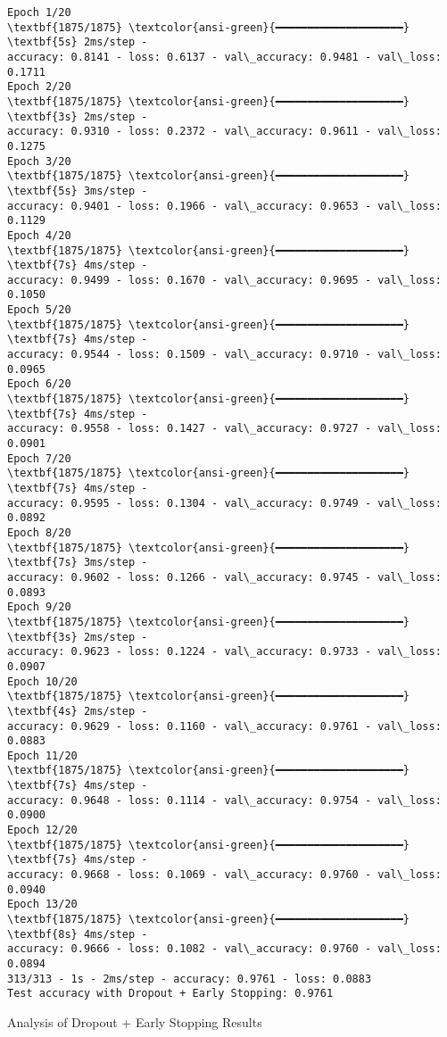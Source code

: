 \documentclass[11pt]{article}
\begin{document}
    \begin{Verbatim}[commandchars=\\\{\}]
Epoch 1/20
\textbf{1875/1875} \textcolor{ansi-green}{━━━━━━━━━━━━━━━━━━━━} \textbf{5s} 2ms/step -
accuracy: 0.8141 - loss: 0.6137 - val\_accuracy: 0.9481 - val\_loss: 0.1711
Epoch 2/20
\textbf{1875/1875} \textcolor{ansi-green}{━━━━━━━━━━━━━━━━━━━━} \textbf{3s} 2ms/step -
accuracy: 0.9310 - loss: 0.2372 - val\_accuracy: 0.9611 - val\_loss: 0.1275
Epoch 3/20
\textbf{1875/1875} \textcolor{ansi-green}{━━━━━━━━━━━━━━━━━━━━} \textbf{5s} 3ms/step -
accuracy: 0.9401 - loss: 0.1966 - val\_accuracy: 0.9653 - val\_loss: 0.1129
Epoch 4/20
\textbf{1875/1875} \textcolor{ansi-green}{━━━━━━━━━━━━━━━━━━━━} \textbf{7s} 4ms/step -
accuracy: 0.9499 - loss: 0.1670 - val\_accuracy: 0.9695 - val\_loss: 0.1050
Epoch 5/20
\textbf{1875/1875} \textcolor{ansi-green}{━━━━━━━━━━━━━━━━━━━━} \textbf{7s} 4ms/step -
accuracy: 0.9544 - loss: 0.1509 - val\_accuracy: 0.9710 - val\_loss: 0.0965
Epoch 6/20
\textbf{1875/1875} \textcolor{ansi-green}{━━━━━━━━━━━━━━━━━━━━} \textbf{7s} 4ms/step -
accuracy: 0.9558 - loss: 0.1427 - val\_accuracy: 0.9727 - val\_loss: 0.0901
Epoch 7/20
\textbf{1875/1875} \textcolor{ansi-green}{━━━━━━━━━━━━━━━━━━━━} \textbf{7s} 4ms/step -
accuracy: 0.9595 - loss: 0.1304 - val\_accuracy: 0.9749 - val\_loss: 0.0892
Epoch 8/20
\textbf{1875/1875} \textcolor{ansi-green}{━━━━━━━━━━━━━━━━━━━━} \textbf{7s} 3ms/step -
accuracy: 0.9602 - loss: 0.1266 - val\_accuracy: 0.9745 - val\_loss: 0.0893
Epoch 9/20
\textbf{1875/1875} \textcolor{ansi-green}{━━━━━━━━━━━━━━━━━━━━} \textbf{3s} 2ms/step -
accuracy: 0.9623 - loss: 0.1224 - val\_accuracy: 0.9733 - val\_loss: 0.0907
Epoch 10/20
\textbf{1875/1875} \textcolor{ansi-green}{━━━━━━━━━━━━━━━━━━━━} \textbf{4s} 2ms/step -
accuracy: 0.9629 - loss: 0.1160 - val\_accuracy: 0.9761 - val\_loss: 0.0883
Epoch 11/20
\textbf{1875/1875} \textcolor{ansi-green}{━━━━━━━━━━━━━━━━━━━━} \textbf{7s} 4ms/step -
accuracy: 0.9648 - loss: 0.1114 - val\_accuracy: 0.9754 - val\_loss: 0.0900
Epoch 12/20
\textbf{1875/1875} \textcolor{ansi-green}{━━━━━━━━━━━━━━━━━━━━} \textbf{7s} 4ms/step -
accuracy: 0.9668 - loss: 0.1069 - val\_accuracy: 0.9760 - val\_loss: 0.0940
Epoch 13/20
\textbf{1875/1875} \textcolor{ansi-green}{━━━━━━━━━━━━━━━━━━━━} \textbf{8s} 4ms/step -
accuracy: 0.9666 - loss: 0.1082 - val\_accuracy: 0.9760 - val\_loss: 0.0894
313/313 - 1s - 2ms/step - accuracy: 0.9761 - loss: 0.0883
Test accuracy with Dropout + Early Stopping: 0.9761
    \end{Verbatim}

    Analysis of Dropout + Early Stopping Results
\end{document}
